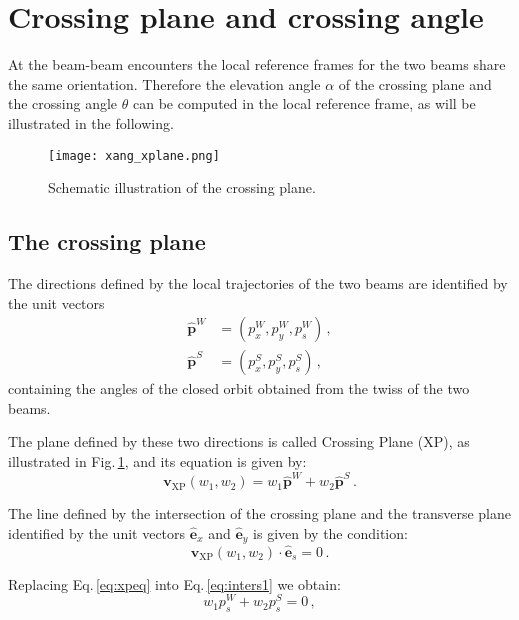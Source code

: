 \section{Crossing plane and crossing angle}
\label{sec:xing}

At the beam-beam encounters the local reference frames for the two beams share the same orientation. Therefore the elevation angle $\alpha$ of the crossing plane  and the crossing angle $\theta$ can be computed in the local reference frame, as will be illustrated in the following.



\begin{figure}[t]
\centering
\texttt{[image: xang\_xplane.png]}
\caption{\small Schematic illustration of the crossing plane. \label{fig:xing}}
\end{figure}

\subsection{The crossing plane}

The directions defined by the local trajectories of the two beams are identified by the unit vectors
\begin{align}
\hat{\textbf{p}}^W &= \left(p^W_x, p^W_y, p^W_s\right) \, ,\\
\hat{\textbf{p}}^S &= \left(p^S_x, p^S_y, p^S_s\right) \, ,\
\end{align}
containing the angles of the closed orbit obtained from the twiss of the two beams.

The plane defined by these two directions is called Crossing Plane (XP), as illustrated in Fig.\,\ref{fig:xing}, and its equation is given by:
\begin{equation}
    \textbf{v}_\text{XP}(w_1, w_2) = w_1 \hat{\textbf{p}}^W +
    w_2 \hat{\textbf{p}}^S \, .
\label{eq:xpeq}
\end{equation}

The line defined by the intersection of the crossing plane and the transverse plane identified by the unit vectors $\hat{\textbf{e}}_x$  and $\hat{\textbf{e}}_y$ is given by the condition:
\begin{equation}
\textbf{v}_\text{XP}(w_1, w_2) \cdot \hat{\textbf{e}}_s=0 \, .
\label{eq:inters1}
\end{equation}

Replacing Eq.\,\eqref{eq:xpeq} into Eq.\,\eqref{eq:inters1} we obtain:
\begin{equation}
 w_1 p^W_s + w_2 p^S_s = 0 \, ,
\end{equation}

